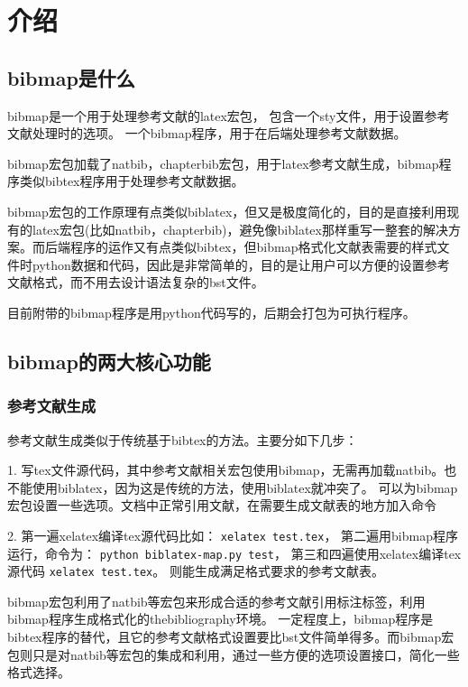\documentclass{article}
\begin{document}
\section{介绍}

\subsection{bibmap是什么}

bibmap是一个用于处理参考文献的latex宏包，
包含一个sty文件，用于设置参考文献处理时的选项。
一个bibmap程序，用于在后端处理参考文献数据。

bibmap宏包加载了natbib，chapterbib宏包，用于latex参考文献生成，bibmap程序类似bibtex程序用于处理参考文献数据。

bibmap宏包的工作原理有点类似biblatex，但又是极度简化的，目的是直接利用现有的latex宏包(比如natbib，chapterbib)，避免像biblatex那样重写一整套的解决方案。而后端程序的运作又有点类似bibtex，但bibmap格式化文献表需要的样式文件时python数据和代码，因此是非常简单的，目的是让用户可以方便的设置参考文献格式，而不用去设计语法复杂的bst文件。

目前附带的bibmap程序是用python代码写的，后期会打包为可执行程序。

\subsection{bibmap的两大核心功能}

\subsubsection{参考文献生成}

参考文献生成类似于传统基于bibtex的方法。主要分如下几步：

1. 写tex文件源代码，其中参考文献相关宏包使用bibmap，无需再加载natbib。也不能使用biblatex，因为这是传统的方法，使用biblatex就冲突了。
可以为bibmap宏包设置一些选项。文档中正常引用文献，在需要生成文献表的地方加入命令\verb||

2. 第一遍xelatex编译tex源代码比如：
\verb|xelatex test.tex|，
第二遍用bibmap程序运行，命令为：
\verb|python biblatex-map.py test|，
第三和四遍使用xelatex编译tex源代码
\verb|xelatex test.tex|。
则能生成满足格式要求的参考文献表。

bibmap宏包利用了natbib等宏包来形成合适的参考文献引用标注标签，利用bibmap程序生成格式化的thebibliography环境。
一定程度上，bibmap程序是bibtex程序的替代，且它的参考文献格式设置要比bst文件简单得多。而bibmap宏包则只是对natbib等宏包的集成和利用，通过一些方便的选项设置接口，简化一些格式选择。
\end{document}
